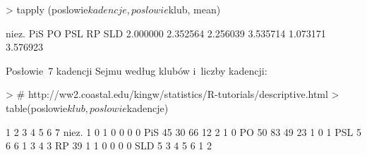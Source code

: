 \documentclass[a4paper]{article}
\begin{document}
\begin{Schunk}
\begin{Sinput}
> tapply (poslowie$kadencje, poslowie$klub, mean)
\end{Sinput}
\begin{Soutput}
   niez.      PiS       PO      PSL       RP      SLD 
2.000000 2.352564 2.256039 3.535714 1.073171 3.576923 
\end{Soutput}
\end{Schunk}

Posłowie~7 kadencji Sejmu według klubów i~liczby kadencji:

\begin{Schunk}
\begin{Sinput}
> # http://ww2.coastal.edu/kingw/statistics/R-tutorials/descriptive.html
> table(poslowie$klub, poslowie$kadencje)
\end{Sinput}
\begin{Soutput}
         1  2  3  4  5  6  7
  niez.  1  0  1  0  0  0  0
  PiS   45 30 66 12  2  1  0
  PO    50 83 49 23  1  0  1
  PSL    5  6  6  1  3  4  3
  RP    39  1  1  0  0  0  0
  SLD    5  3  4  5  6  1  2
\end{Soutput}
\end{Schunk}
\end{document}
